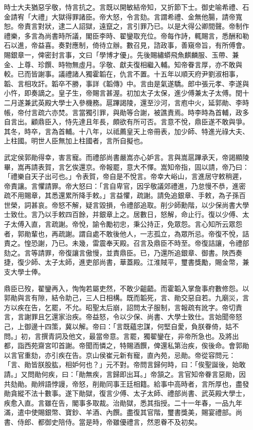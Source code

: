 \begin{pinyinscope}
時士大夫猶惡孚敬，恃言抗之。言既以開敏結帝知，又折節下士。御史喻希禮、石金請宥「大禮」大獄得罪諸臣。帝大怒，令言劾。言謂希禮、金無他腸，請帝寬恕。帝責言對狀，逮二人詔獄，遠竄之，言引罪乃已。以是大得公卿間聲。帝制作禮樂，多言為尚書時所議，閣臣李時、翟鑾取充位。帝每作詩，輒賜言，悉酬和勒石以進，帝益喜。奏對應制，倚待立辦。數召見，諮政事，善窺帝旨，有所傅會。賜銀章一，俾密封言事，文曰「學博才優」。先後賜繡蟒飛魚麒麟服、玉帶、兼金、上尊、珍饌、時物無虛月。孚敬、獻夫復相繼入輔。知帝眷言厚，亦不敢與較。已而皆謝事。議禮諸人獨霍韜在，仇言不置。十五年以順天府尹劉淑相事，韜、言相攻訐。韜卒不勝，事詳《韜傳》中。言由是氣遂驕。郎中張元孝、李遂與小忤，即奏謫之。皇子生，帝賜言甚渥。初加太子太保，進少傅兼太子太傅。閏十二月遂兼武英殿大學士入參機務。扈蹕謁陵，還至沙河，言庖中火，延郭勛、李時帳，帝付言疏六亦焚。言當獨引罪，與勛等合謝，被譙責焉。時李時為首輔，政多自言出。顧鼎臣入，恃先達且年長，頗欲有所可否。言意不悅，鼎臣遂不敢與爭。其冬，時卒，言為首輔。十八年，以祗薦皇天上帝冊表，加少師、特進光祿大夫、上柱國。明世人臣無加上柱國者，言所自擬也。

武定侯郭勛得幸，害言寵。而禮部尚書嚴嵩亦心妒言。言與嵩扈蹕承天，帝謁顯陵畢，嵩再請表賀，言乞俟還京。帝報罷，意大不懌。嵩知帝指，固以請，帝乃曰：「禮樂自天子出可也。」令表賀，帝自是不悅言。帝幸大峪山，言進居守敕稍遲，帝責讓。言懼請罪。帝大怒曰：「言自卑官，因孚敬議郊禮進，乃怠慢不恭，進密疏不用賜章，其悉還累所降手敕。」言益懼，疏謝。請免追銀章、手敕，為子孫百世榮，詞甚哀。帝怒不解，疑言毀損，令禮部追取。削少師勳階，以少保尚書大學士致仕。言乃以手敕四百餘，并銀章上之。居數日，怒解，命止行。復以少傅、太子太傅入直，言疏謝。帝悅，諭令勵初忠，秉公持正，免眾怨。言心知所云眾怨者，郭勛輩也，再疏謝。謂自處不敢後他人，一志孤立，為眾所忌。帝復不悅，詰責之。惶恐謝，乃已。未幾，雷震奉天殿。召言及鼎臣不時至。帝復詰讓，令禮部劾之。言等請罪，帝復讓言傲慢，並責鼎臣。已，乃還所追銀章、御書。陜西奏捷，復少師、太子太師，進吏部尚書，華蓋殿。江淮賊平，璽書獎勵，賜金幣，兼支大學士俸。

鼎臣已歿，翟鑾再入，恂恂若屬吏然，不敢少齟齬。而霍韜入掌詹事府數修怨。以郭勛與言有隙，結令助己，三人日相構。既而韜死，言、勛交惡自若。九廟災，言方以疾在告，乞罷，不允。昭聖太后崩，詔問太子服制，言報疏有訛字。帝切責言，言謝罪且乞還家治疾。帝益怒，令以少保、尚書、大學士致仕。言始聞帝怒己，上御邊十四策，冀以解。帝曰：「言既蘊忠謀，何堅自愛，負朕眷倚，姑不問。」初，言撰青詞及他文，最當帝意。言罷，獨翟鑾在，非帝所急也。及將出都，詣西苑齋宮叩首謝。帝聞而憐之，特賜酒饌，俾還私第治疾，俟後命。會郭勛以言官重劾，亦引疾在告。京山侯崔元新有寵，直內苑，忌勛。帝從容問元：「言、勛皆朕股肱，相妒何也？」元不對。帝問言歸何時，曰：「俟聖誕後，始敢請。」又問勛何疾，曰：「勛無疾，言歸即出耳。」帝頷之。言官知帝眷言惡勛，因共劾勛。勛辨語悖謾，帝怒，削勛同事王廷相籍。給事中高時者，言所厚也，盡發勛貪縱不法十數事。遂下勛獄，復言少傅、太子太師、禮部尚書、武英殿大學士，疾愈入直。言雖在告，閣事多取裁。治勛獄，悉其指授。二十一年春，一品九年滿，遣中使賜銀幣、寶鈔、羊酒、內饌。盡復其官階，璽書獎美，賜宴禮部。尚書、侍郎、都御史陪侍。當是時，帝雖優禮言，然恩眷不及初矣。


\end{pinyinscope}
